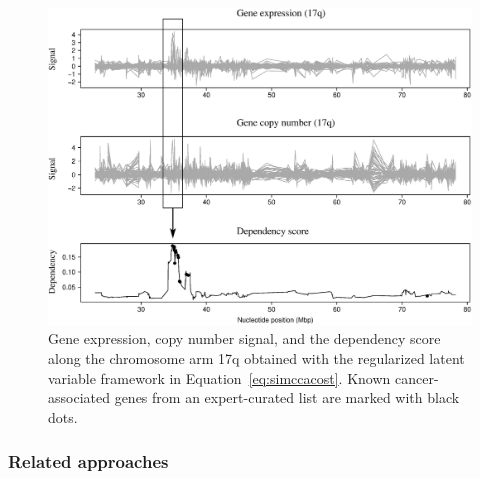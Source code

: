 \begin{figure}[ht!]
\centerline{
\includegraphics[width=1\textwidth]{pic/17q.eps}} 
\caption{Gene expression, copy number signal, and the dependency score
  along the chromosome arm 17q obtained with the regularized latent
  variable framework in Equation~\ref{eq:simccacost}. Known
  cancer-associated genes from an expert-curated list are marked with
  black dots.}
\label{fig:17q}
\end{figure}

\subsubsection{Related approaches}

